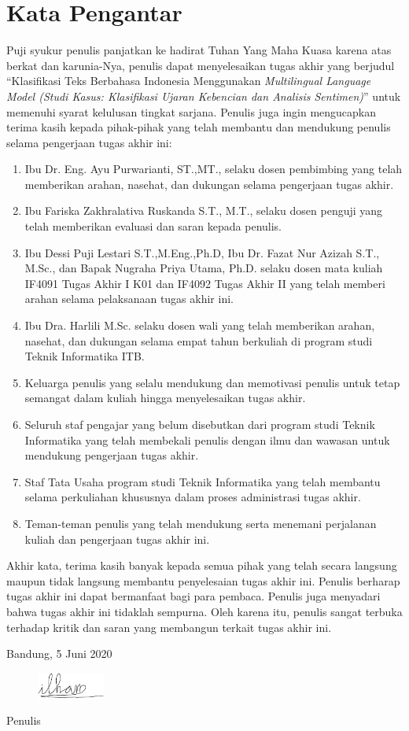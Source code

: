 \chapter*{Kata Pengantar}

Puji syukur penulis panjatkan ke hadirat Tuhan Yang Maha Kuasa karena atas berkat dan karunia-Nya, penulis dapat menyelesaikan tugas akhir yang berjudul “Klasifikasi Teks Berbahasa Indonesia Menggunakan \textit{Multilingual Language Model (Studi Kasus: Klasifikasi Ujaran Kebencian dan Analisis Sentimen)}” untuk memenuhi syarat kelulusan tingkat sarjana. Penulis juga ingin mengucapkan terima kasih kepada pihak-pihak yang telah membantu dan mendukung penulis selama pengerjaan tugas akhir ini:

\begin{enumerate}
    \item Ibu Dr. Eng. Ayu Purwarianti, ST.,MT., selaku dosen pembimbing yang telah memberikan arahan, nasehat, dan dukungan selama pengerjaan tugas akhir.
    \item Ibu Fariska Zakhralativa Ruskanda S.T., M.T., selaku dosen penguji yang telah memberikan evaluasi dan saran kepada penulis.
    \item Ibu Dessi Puji Lestari S.T.,M.Eng.,Ph.D, Ibu Dr. Fazat Nur Azizah S.T., M.Sc., dan Bapak Nugraha Priya Utama, Ph.D. selaku dosen mata kuliah IF4091 Tugas Akhir I K01 dan IF4092 Tugas Akhir II yang telah memberi arahan selama pelaksanaan tugas akhir ini.
    \item Ibu Dra. Harlili M.Sc. selaku dosen wali yang telah memberikan arahan, nasehat, dan dukungan selama empat tahun berkuliah di program studi Teknik Informatika ITB.
    \item Keluarga penulis yang selalu mendukung dan memotivasi penulis untuk tetap semangat dalam kuliah hingga menyelesaikan tugas akhir.
    \item Seluruh staf pengajar yang belum disebutkan dari program studi Teknik Informatika yang telah membekali penulis dengan ilmu dan wawasan untuk mendukung pengerjaan tugas akhir.
    \item Staf Tata Usaha program studi Teknik Informatika yang telah membantu selama perkuliahan khususnya dalam proses administrasi tugas akhir.
    \item Teman-teman penulis yang telah mendukung serta menemani perjalanan kuliah dan pengerjaan tugas akhir ini.

    
\end{enumerate}
Akhir kata, terima kasih banyak kepada semua pihak yang telah secara langsung maupun tidak langsung membantu penyelesaian tugas akhir ini. Penulis berharap tugas akhir ini dapat bermanfaat bagi para pembaca. Penulis juga menyadari bahwa tugas akhir ini tidaklah sempurna. Oleh karena itu, penulis sangat terbuka terhadap kritik dan saran yang membangun terkait tugas akhir ini.

\begin{flushright} 
    Bandung, 5 Juni 2020 \\
    \begin{figure}[!h]
        \raggedleft
        \includegraphics[width=0.2\textwidth]{resources/tandatangan.png}
    \end{figure}
    Penulis
\end{flushright}
\clearpage
